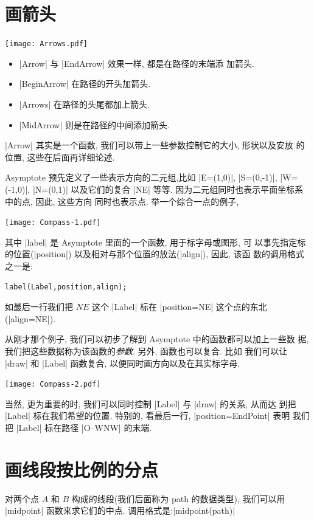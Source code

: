 \documentclass[nofonts,CJKnormalspaces]{ctexbook}[2009/05/20]
\begin{document}
\section{画箭头}
\begin{center}\texttt{[image: Arrows.pdf]}\end{center}%


\begin{itemize}
\item |Arrow| 与 |EndArrow| 效果一样, 都是在路径的末端添
  加箭头.
\item |BeginArrow| 在路径的开头加箭头.
\item |Arrows| 在路径的头尾都加上箭头.
\item |MidArrow| 则是在路径的中间添加箭头.
\end{itemize}
|Arrow| 其实是一个函数, 我们可以带上一些参数控制它的大小, 形状以及安放
的位置, 这些在后面再详细论述.

Asymptote 预先定义了一些表示方向的二元组,比如  |E=(1,0)|,
|S=(0,-1)|, |W=(-1,0)|, |N=(0,1)| 以及它们的复合
|NE| 等等. 因为二元组同时也表示平面坐标系中的点, 因此, 这些方向
同时也表示点. 举一个综合一点的例子,

\begin{center}\texttt{[image: Compass-1.pdf]}\end{center}%


其中 |label| 是 Asymptote 里面的一个函数, 用于标字母或图形, 可
以事先指定标的位置(|position|) 以及相对与那个位置的放法(|align|), 因此, 该函
数的调用格式之一是:
\begin{verbatim}
label(Label,position,align);
\end{verbatim}
如最后一行我们把 $NE$ 这个 |Label| 标在 |position=NE| 这个点的东北
(|align=NE|).

从刚才那个例子, 我们可以初步了解到 Asymptote 中的函数都可以加上一些数
据, 我们把这些数据称为该函数的\emph{参数}. 另外, 函数也可以复合. 比如
我们可以让 |draw| 和 |Label| 函数复合, 以便同时画方向以及在其实标字母.
\begin{center}\texttt{[image: Compass-2.pdf]}\end{center}%

当然, 更为重要的时, 我们可以同时控制 |Label| 与 |draw| 的关系, 从而达
到把 |Label| 标在我们希望的位置. 特别的, 看最后一行, |position=EndPoint| 表明
我们把 |Label| 标在路径 |O--WNW| 的末端.

\section{画线段按比例的分点}
对两个点 $A$ 和 $B$ 构成的线段(我们后面称为 {path} 的数据类型),
我们可以用 |midpoint| 函数来求它们的中点.
调用格式是:|midpoint(path)|
\end{document}

